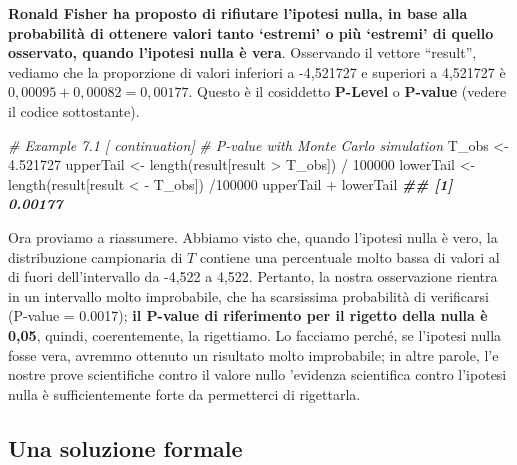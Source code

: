 \documentclass[
  12pt,
]{book}
\newenvironment{Shaded}{\begin{snugshade}}{\end{snugshade}}
\newcommand{\CommentTok}[1]{\textcolor[rgb]{0.56,0.35,0.01}{\textit{#1}}}
\newcommand{\DecValTok}[1]{\textcolor[rgb]{0.00,0.00,0.81}{#1}}
\newcommand{\DocumentationTok}[1]{\textcolor[rgb]{0.56,0.35,0.01}{\textbf{\textit{#1}}}}
\newcommand{\FloatTok}[1]{\textcolor[rgb]{0.00,0.00,0.81}{#1}}
\newcommand{\FunctionTok}[1]{\textcolor[rgb]{0.00,0.00,0.00}{#1}}
\newcommand{\NormalTok}[1]{#1}
\newcommand{\OtherTok}[1]{\textcolor[rgb]{0.56,0.35,0.01}{#1}}
\newcommand{\SpecialCharTok}[1]{\textcolor[rgb]{0.00,0.00,0.00}{#1}}
\begin{document}
\textbf{Ronald Fisher ha proposto di rifiutare l'ipotesi nulla, in base alla probabilità di ottenere valori tanto `estremi' o più `estremi' di quello osservato, quando l'ipotesi nulla è vera}. Osservando il vettore ``result'', vediamo che la proporzione di valori inferiori a -4,521727 e superiori a 4,521727 è \(0,00095 + 0,00082 = 0,00177\). Questo è il cosiddetto \textbf{P-Level} o \textbf{P-value} (vedere il codice sottostante).

\vspace{12pt}

\begin{Shaded}
\begin{Highlighting}[]
\CommentTok{\# Example 7.1 [ continuation]}
\CommentTok{\# P{-}value with Monte Carlo simulation}
\NormalTok{T\_obs }\OtherTok{\textless{}{-}} \FloatTok{4.521727}
\NormalTok{upperTail }\OtherTok{\textless{}{-}} \FunctionTok{length}\NormalTok{(result[result }\SpecialCharTok{\textgreater{}}\NormalTok{ T\_obs]) }\SpecialCharTok{/} \DecValTok{100000}
\NormalTok{lowerTail }\OtherTok{\textless{}{-}} \FunctionTok{length}\NormalTok{(result[result }\SpecialCharTok{\textless{}} \SpecialCharTok{{-}}\NormalTok{ T\_obs]) }\SpecialCharTok{/}\DecValTok{100000} 
\NormalTok{upperTail }\SpecialCharTok{+}\NormalTok{ lowerTail}
\DocumentationTok{\#\# [1] 0.00177}
\end{Highlighting}
\end{Shaded}

Ora proviamo a riassumere. Abbiamo visto che, quando l'ipotesi nulla è vero, la distribuzione campionaria di \(T\) contiene una percentuale molto bassa di valori al di fuori dell'intervallo da -4,522 a 4,522. Pertanto, la nostra osservazione rientra in un intervallo molto improbabile, che ha scarsissima probabilità di verificarsi (P-value = 0.0017); \textbf{il P-value di riferimento per il rigetto della nulla è 0,05}, quindi, coerentemente, la rigettiamo. Lo facciamo perché, se l'ipotesi nulla fosse vera, avremmo ottenuto un risultato molto improbabile; in altre parole, l'e nostre prove scientifiche contro il valore nullo 'evidenza scientifica contro l'ipotesi nulla è sufficientemente forte da permetterci di rigettarla.

\hypertarget{una-soluzione-formale}{%
\subsection{Una soluzione formale}\label{una-soluzione-formale}}
\end{document}
